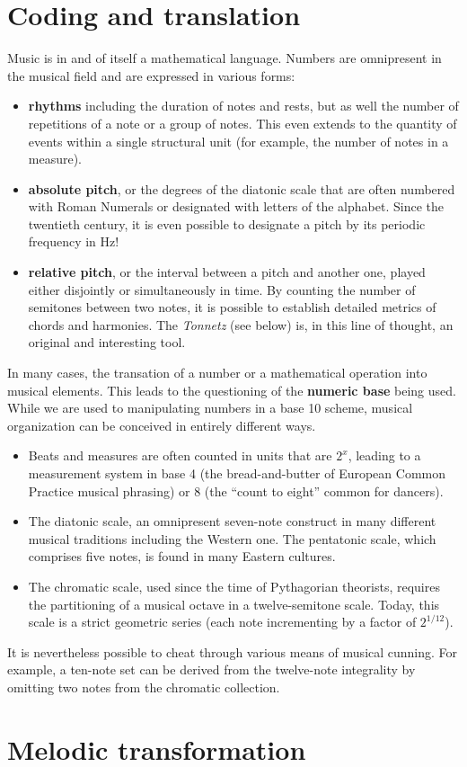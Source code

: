 \documentclass{article}
\begin{document}
\section*{Coding and translation}
Music is in and of itself a mathematical language. Numbers are omnipresent in the musical field and are expressed in various forms:

\begin{itemize}
\item \textbf{rhythms} including the duration of notes and rests, but as
well the number of repetitions of a note or a group of notes.  This even
extends to the quantity of events within a single structural unit (for
example, the number of notes in a measure).
\item \textbf{absolute pitch}, or the degrees of the diatonic scale that are
often numbered with Roman Numerals or designated with letters of the
alphabet. Since the twentieth century, it is even possible to designate a
pitch by its periodic frequency in Hz!
\item \textbf{relative pitch}, or the interval between a pitch and another
one, played either disjointly or simultaneously in time. By counting the
number of semitones between two notes, it is possible to establish detailed
metrics of chords and harmonies. The \emph{Tonnetz} (see below) is, in this
line of thought, an original and interesting tool.
\end{itemize}
In many cases, the transation of a number or a mathematical operation
into musical elements.  This leads to the questioning of the \textbf{numeric
base} being used.  While we are used to manipulating numbers in a base 10
scheme, musical organization can be conceived in entirely different ways.
\begin{itemize}
\item Beats and measures are often counted in units that are $2^x$, leading
to a measurement system in base 4 (the bread-and-butter of European Common Practice
musical phrasing) or 8 (the ``count to eight'' common for dancers).
\item The diatonic scale, an omnipresent seven-note construct in many different musical
traditions including the Western one. The pentatonic scale, which comprises
five notes, is found in many Eastern cultures.
\item The chromatic scale, used since the time of Pythagorian theorists,
requires the partitioning of a musical octave in a twelve-semitone scale.
Today, this scale is a strict geometric series (each note incrementing by a
factor of $2^{1/12}$).
\end{itemize}
It is nevertheless possible to cheat through various means of musical
cunning.  For example, a ten-note set can be derived from the twelve-note
integrality by omitting two notes from the chromatic collection.
\section*{Melodic transformation}
\end{document}
